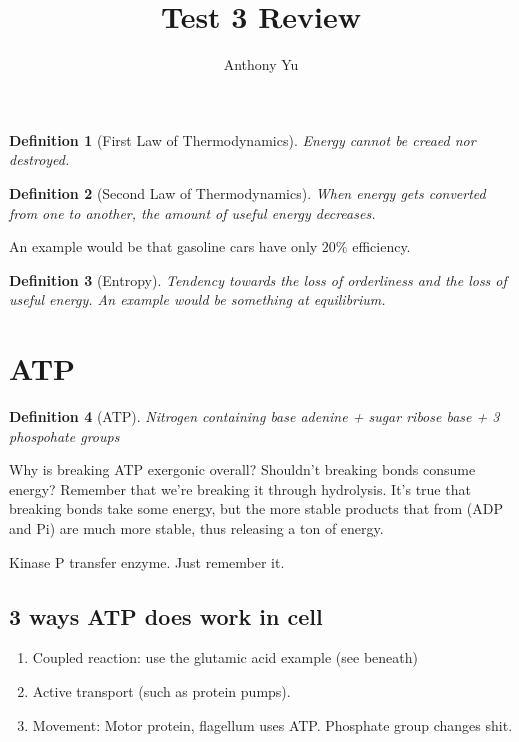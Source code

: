 \documentclass[12pt]{article}
\title{Test 3 Review}
\author{Anthony Yu}
\begin{document}
\newcommand{\problem}[1]{\subsection*{Problem {#1}}}
\newenvironment{enumAlph}{\begin{enumerate}[label=(\alph*)]}{\end{enumerate}}

\makeatletter
\newcommand{\skipitems}[1]{%
\addtocounter{\@enumctr}{#1}%
}
\makeatother

\newcommand{\chunit}[3]{\qty{#1}{{#2}\,\ce{#3}}}
\newcommand{\chuniteval}[3]{\qty[evaluate-expression]{#1}{{#2}\,\ce{#3}}}

\newtheorem{definition}{Definition}

\maketitle

\begin{definition}[First Law of Thermodynamics]
    Energy cannot be creaed nor destroyed. 
\end{definition}
\begin{definition}[Second Law of Thermodynamics]
    When energy gets converted from one to another, the amount of useful energy decreases. 
\end{definition}
An example would be that gasoline cars have only $20\%$ efficiency. 
\begin{definition}[Entropy]
    Tendency towards the loss of orderliness and the loss of useful energy.
    An example would be something at equilibrium. 
\end{definition}

\section{ATP}
\begin{definition}[ATP]
    Nitrogen containing base adenine + sugar ribose base + 3 phospohate groups
\end{definition}
Why is breaking ATP exergonic overall? Shouldn't breaking bonds consume energy?
Remember that we're breaking it through hydrolysis. It's true that
breaking bonds take some energy, but the more stable products that from
(ADP and Pi) are much more stable, thus releasing a ton of energy. 

Kinase P transfer enzyme. Just remember it. 

\subsection{3 ways ATP does work in cell}
\begin{enumerate}
    \item Coupled reaction: use the glutamic acid example (see beneath)
    \item Active transport (such as protein pumps). 
    \item Movement: Motor protein, flagellum uses ATP. Phosphate group changes shit. 
\end{enumerate}
\end{document}
